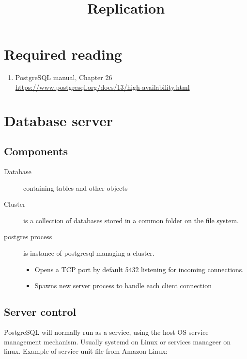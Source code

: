\documentclass{pgnotes}
\title{Replication}
\begin{document}
\maketitle

\section*{Required reading}

\begin{enumerate}
\item PostgreSQL manual, Chapter 26 \\
  \url{https://www.postgresql.org/docs/13/high-availability.html}
\end{enumerate}
  
\tableofcontents

\section{Database server}

\subsection{Components}

\begin{description}
\item[Database] containing tables and other objects
\item[Cluster] is a collection of databases stored in a common folder on the file system.
\item[postgres process] is instance of postgresql managing a cluster.
  \begin{itemize}
  \item Opens a TCP port by default 5432 listening for incoming connections.
  \item Spawns new server process to handle each client connection
  \end{itemize}
\end{description}

\subsection{Server control}

PostgreSQL will normally run as a service, using the host OS service management mechanism.
Usually systemd on Linux or services manageer on linux. 
Example of service unit file from Amazon Linux: 
\inputminted{ini}{pgsql.service.txt}
\end{document}
